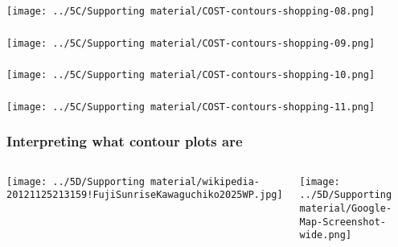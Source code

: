 \documentclass[handout,11pt,aspectratio=169,mathserif]{beamer}
\begin{document}
\begin{frame}\frametitle{}
	\centerline{\texttt{[image: ../5C/Supporting material/COST-contours-shopping-08.png]}}
\end{frame}
\begin{frame}\frametitle{}
	\centerline{\texttt{[image: ../5C/Supporting material/COST-contours-shopping-09.png]}}
\end{frame}
\begin{frame}\frametitle{}
	\centerline{\texttt{[image: ../5C/Supporting material/COST-contours-shopping-10.png]}}
\end{frame}
\begin{frame}\frametitle{}
	\centerline{\texttt{[image: ../5C/Supporting material/COST-contours-shopping-11.png]}}
\end{frame}
\begin{frame}\frametitle{Interpreting what contour plots are}
	\begin{columns}[b]
			\centerline{\texttt{[image: ../5D/Supporting material/wikipedia-20121125213159!FujiSunriseKawaguchiko2025WP.jpg]}}
			
		
			\centerline{\texttt{[image: ../5D/Supporting material/Google-Map-Screenshot-wide.png]}}

	\end{columns}
\end{frame}
\end{document}
